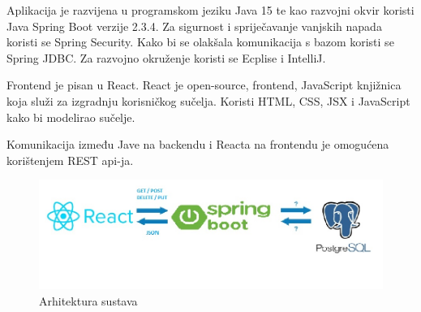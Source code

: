 		Aplikacija je razvijena u programskom jeziku Java 15 te kao razvojni okvir koristi Java Spring Boot verzije 2.3.4. Za sigurnost i spriječavanje vanjskih napada koristi se Spring Security.
		Kako bi se olakšala komunikacija s bazom koristi se Spring JDBC.  
		Za razvojno okruženje koristi se Ecplise i IntelliJ.
		 
		
		Frontend je pisan u  React. React je open-source, frontend, JavaScript knjižnica koja služi  za izgradnju korisničkog sučelja. Koristi HTML, CSS, JSX i JavaScript kako bi modelirao sučelje.
		
		Komunikacija između Jave na backendu i Reacta na frontendu je omogućena korištenjem REST api-ja.
		\begin{figure}[H]
			\includegraphics[scale=0.7]{slike/arhitektura2.jpg} %
			\centering
			\caption {Arhitektura sustava}
			\label{fig:promjene}
		\end{figure}
	
